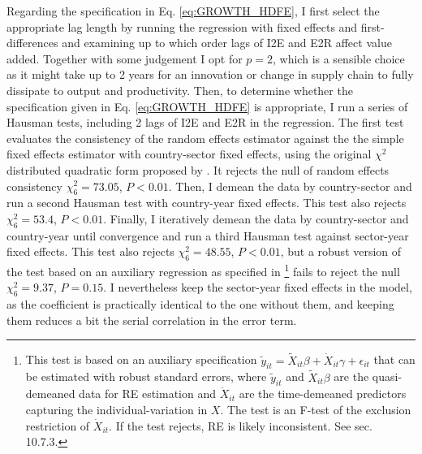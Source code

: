 \documentclass[a4paper]{article}
\begin{document}
Regarding the specification in Eq. \ref{eq:GROWTH_HDFE}, I first select the appropriate lag length by running the regression with fixed effects and first-differences and examining up to which order lags of I2E and E2R affect value added. Together with some judgement I opt for $p = 2$, which is a sensible choice as it might take up to 2 years for an innovation or change in supply chain to fully dissipate to output and productivity. Then, to determine whether the specification given in Eq. \ref{eq:GROWTH_HDFE} is appropriate, I run a series of Hausman tests, including 2 lags of I2E and E2R in the regression. The first test evaluates the consistency of the random effects estimator against the the  simple fixed effects estimator with country-sector fixed effects, using the original $\chi^2$ distributed quadratic form proposed by \citet{hausman1978specification}. It rejects the null of random effects consistency $\chi^2_6 = 73.05$, $P < 0.01$. Then, I demean the data by country-sector and run a second Hausman test with country-year fixed effects. This test also rejects $\chi^2_6 = 53.4$, $P < 0.01$. Finally, I iteratively demean the data by country-sector and country-year until convergence and run a third Hausman test against sector-year fixed effects. This test also rejects $\chi^2_6 = 48.55$, $P < 0.01$, but a robust version of the test based on an auxiliary regression as specified in \citet{wooldridge2010econometric}\footnote{This test is based on an auxiliary specification $\tilde{y}_{it} = \tilde{X}_{it}\beta + \dot{X}_{it}\gamma + \epsilon_{it}$ that can be estimated with robust standard errors, where  $\tilde{y}_{it} $ and $\tilde{X}_{it}\beta$ are the quasi-demeaned data for RE estimation and $\dot{X}_{it}$ are the time-demeaned predictors capturing the individual-variation in $X$. The test is an F-test of the exclusion restriction of $\dot{X}_{it}$. If the test rejects, RE is likely inconsistent. See \citet{wooldridge2010econometric} sec. 10.7.3.} fails to reject the null $\chi^2_6 = 9.37$, $P = 0.15$. I nevertheless keep the sector-year fixed effects in the model, as the coefficient is practically identical to the one without them, and keeping them reduces a bit the serial correlation in the error term. \newline
\end{document}
